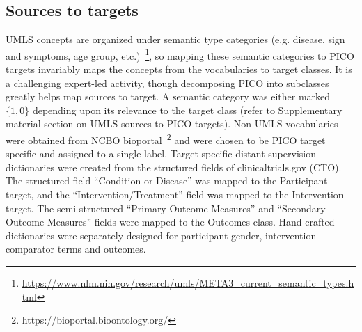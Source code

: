 \documentclass[10.7pt,]{article}
\begin{document}
\subsection{Sources to targets}\label{s2t}
%
UMLS concepts are organized under semantic type categories (e.g. disease, sign and symptoms, age group, etc.)~\footnote{\url{https://www.nlm.nih.gov/research/umls/META3_current_semantic_types.html}}, so mapping these semantic categories to PICO targets invariably maps the concepts from the vocabularies to target classes.
It is a challenging expert-led activity, though decomposing PICO into subclasses greatly helps map sources to target.
A semantic category was either marked $\{1, 0\}$ depending upon its relevance to the target class (refer to Supplementary material section on UMLS sources to PICO targets).
Non-UMLS vocabularies were obtained from NCBO bioportal~\footnote{https://bioportal.bioontology.org/} and were chosen to be PICO target specific and assigned to a single label.
Target-specific distant supervision dictionaries were created from the structured fields of clinicaltrials.gov (CTO). 
The structured field ``Condition or Disease'' was mapped to the Participant target, and the ``Intervention/Treatment'' field was mapped to the Intervention target.
The semi-structured ``Primary Outcome Measures'' and ``Secondary Outcome Measures'' fields were mapped to the Outcomes class.
Hand-crafted dictionaries were separately designed for participant gender, intervention comparator terms and outcomes.
%
%
%
\end{document}
